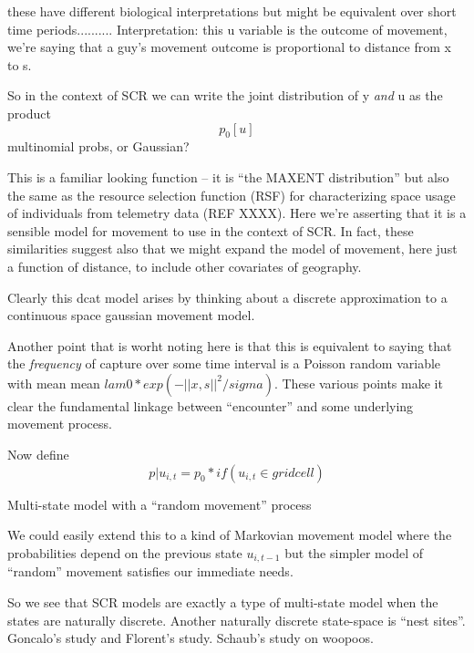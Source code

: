 these have different biological interpretations but might be
equivalent over short time periods..........
Interpretation: this u variable is the outcome of movement,
we're saying that a guy's movement outcome is proportional to distance
from x to s. 

So in the context of SCR we can write the joint distribution of y {\it
  and} u as the product
\[
p_{0} [u]
\]
multinomial probs, or Gaussian?

This is a familiar looking function -- it is ``the MAXENT
distribution'' but also the same as the resource selection function (RSF)
for characterizing space usage of individuals from telemetry data (REF XXXX).
Here we're asserting that it is a sensible model for movement to use in 
the context of SCR. In fact, these similarities suggest also that we might
expand the model of movement, here just a function of distance, to include
other covariates of geography.

Clearly this dcat model arises by thinking about a discrete
approximation to a continuous space
gaussian movement model.

Another point that is worht noting here is that this is equivalent to saying
that the {\it frequency} of capture over some time interval is a Poisson
random variable with mean
mean $lam0*exp(-||x,s||^2/sigma)$.  These   various points
make it clear the fundamental linkage between ``encounter'' and some
underlying movement process.


Now define
\[
 p|u_{i,t} = p_{0}*if(u_{i,t} \in grid cell)
\]

Multi-state model with a ``random movement'' process


We could easily extend this to a kind of Markovian movement model
where the probabilities depend on the previous state $u_{i,t-1}$ but
the simpler model of ``random'' movement satisfies our immediate needs.
 
So we see that SCR models are exactly a type of multi-state model when
the states are naturally discrete.  Another naturally discrete
state-space is ``nest sites''. Goncalo’s study and Florent’s
study. Schaub’s study on woopoos.

